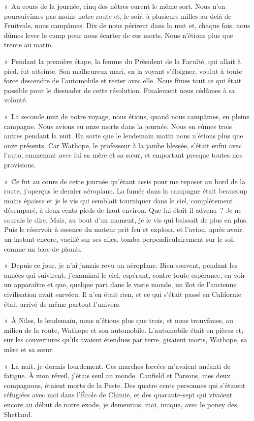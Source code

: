 \documentclass[french,twoside]{book} %
\begin{document}
« Au cours de la journée, cinq des nôtres eurent le même sort. Nous n’en poursuivîmes pas moins notre route et, le soir, à plusieurs milles au-delà de Fruitvale, nous campâmes. Dix de nous périrent dans la nuit et, chaque fois, nous dûmes lever le camp pour nous écarter de ces morts. Nous n’étions plus que trente au matin.\par
« Pendant la première étape, la femme du Président de la Faculté, qui allait à pied, fut atteinte. Son malheureux mari, en la voyant s’éloigner, voulut à toute force descendre de l’automobile et rester avec elle. Nous fîmes tout ce qui était possible pour le dissuader de cette résolution. Finalement nous cédâmes à sa volonté.\par
« La seconde nuit de notre voyage, nous étions, quand nous campâmes, en pleine campagne. Nous avions eu onze morts dans la journée. Nous en eûmes trois autres pendant la nuit. En sorte que le lendemain matin nous n’étions plus que onze présents. Car Wathope, le professeur à la jambe blessée, s’était enfui avec l’auto, emmenant avec lui sa mère et sa sœur, et emportant presque toutes nos provisions.\par
« Ce fut au cours de cette journée qu’étant assis pour me reposer au bord de la route, j’aperçus le dernier aéroplane. La fumée dans la campagne était beaucoup moins épaisse et je le vis qui semblait tourniquer dans le ciel, complètement désemparé, à deux cents pieds de haut environ. Que lui était-il advenu ? Je ne saurais le dire. Mais, au bout d’un moment, je le vis qui baissait de plus en plus. Puis le réservoir à essence du moteur prit feu et explosa, et l’avion, après avoir, un instant encore, vacillé sur ses ailes, tomba perpendiculairement sur le sol, comme un bloc de plomb.\par
« Depuis ce jour, je n’ai jamais revu un aéroplane. Bien souvent, pendant les années qui suivirent, j’examinai le ciel, espérant, contre toute espérance, en voir un apparaître et que, quelque part dans le vaste monde, un îlot de l’ancienne civilisation avait survécu. Il n’en était rien, et ce qui s’était passé en Californie était arrivé de même partout l’univers.\par
« À Niles, le lendemain, nous n’étions plus que trois, et nous trouvâmes, au milieu de la route, Wathope et son automobile. L’automobile était en pièces et, sur les couvertures qu’ils avaient étendues par terre, gisaient morts, Wathope, sa mère et sa sœur.\par
« La nuit, je dormis lourdement. Ces marches forcées m’avaient anéanti de fatigue. À mon réveil, j’étais seul au monde. Canfield et Parsons, mes deux compagnons, étaient morts de la Peste. Des quatre cents personnes qui s’étaient réfugiées avec moi dans l’École de Chimie, et des quarante-sept qui vivaient encore au début de notre exode, je demeurais, moi, unique, avec le poney des Shetland.\par
\end{document}
